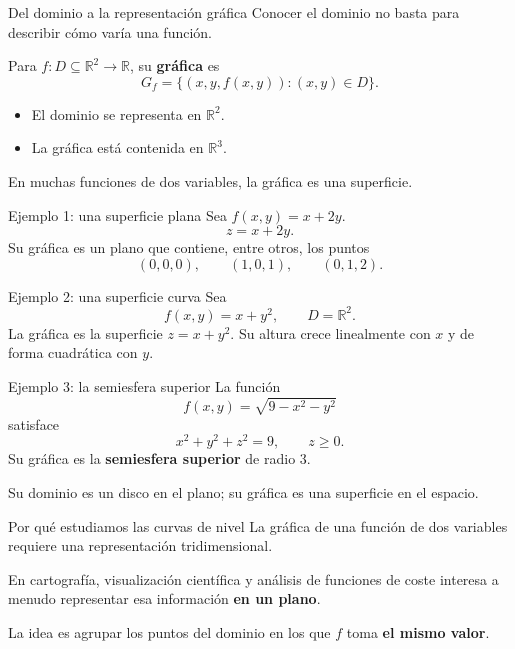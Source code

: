 \documentclass[main.tex]{subfiles}
\begin{document}
\begin{frame}{Del dominio a la representación gráfica}
Conocer el dominio no basta para describir cómo varía una función.
\medskip

Para $f:D\subseteq\mathbb R^2\to\mathbb R$, su \textbf{gráfica} es
\[
\boxed{G_f=\{(x,y,f(x,y)):(x,y)\in D\}.}
\]
\medskip
\begin{itemize}
  \item El dominio se representa en $\mathbb R^2$.
  \item La gráfica está contenida en $\mathbb R^3$.
\end{itemize}
\medskip

En muchas funciones de dos variables, la gráfica es una superficie.
\end{frame}

\begin{frame}{Ejemplo 1: una superficie plana}
Sea $f(x,y)=x+2y$.
\[
z=x+2y.
\]
Su gráfica es un plano que contiene, entre otros, los puntos
\[
(0,0,0),\qquad (1,0,1),\qquad (0,1,2).
\]
\medskip

\begin{center}
\end{center}
\end{frame}

\begin{frame}{Ejemplo 2: una superficie curva}
Sea
\[
f(x,y)=x+y^2,\qquad D=\mathbb R^2.
\]
La gráfica es la superficie $z=x+y^2$. Su altura crece linealmente con $x$ y de forma cuadrática con $y$.
\begin{center}
\end{center}
\end{frame}

\begin{frame}{Ejemplo 3: la semiesfera superior}
La función
\[
f(x,y)=\sqrt{9-x^2-y^2}
\]
satisface
\[
x^2+y^2+z^2=9,\qquad z\geq0.
\]
Su gráfica es la \textbf{semiesfera superior} de radio $3$.
\medskip

Su dominio es un disco en el plano; su gráfica es una superficie en el espacio.
\end{frame}

\begin{frame}{Por qué estudiamos las curvas de nivel}
La gráfica de una función de dos variables requiere una representación tridimensional.
\medskip

En cartografía, visualización científica y análisis de funciones de coste interesa a menudo representar esa información \textbf{en un plano}.
\medskip

La idea es agrupar los puntos del dominio en los que $f$ toma \textbf{el mismo valor}.
\end{frame}
\end{document}

